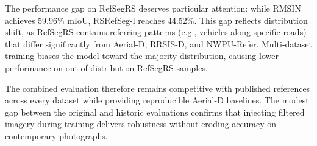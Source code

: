 \documentclass[journal]{IEEEtran}
\begin{document}
The performance gap on RefSegRS deserves particular attention: while RMSIN achieves 59.96\% mIoU, RSRefSeg-l reaches 44.52\%. This gap reflects distribution shift, as RefSegRS contains referring patterns (e.g., vehicles along specific roads) that differ significantly from Aerial-D, RRSIS-D, and NWPU-Refer. Multi-dataset training biases the model toward the majority distribution, causing lower performance on out-of-distribution RefSegRS samples.

The combined evaluation therefore remains competitive with published references across every dataset while providing reproducible Aerial-D baselines. The modest gap between the original and historic evaluations confirms that injecting filtered imagery during training delivers robustness without eroding accuracy on contemporary photographs.

\begin{table}[t]
\centering
\caption{Aerial-D supervision variants evaluated on the validation split (historic scores in \textcolor{blue}{blue}).}
\label{tab:aeriald_variants}
\end{table}
\end{document}
